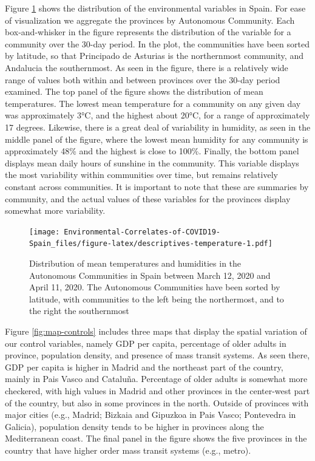 \documentclass[]{elsarticle} %
\begin{document}
Figure \ref{fig:descriptives-temperature} shows the distribution of the
environmental variables in Spain. For ease of visualization we aggregate
the provinces by Autonomous Community. Each box-and-whisker in the
figure represents the distribution of the variable for a community over
the 30-day period. In the plot, the communities have been sorted by
latitude, so that Principado de Asturias is the northernmost community,
and Andalucia the southernmost. As seen in the figure, there is a
relatively wide range of values both within and between provinces over
the 30-day period examined. The top panel of the figure shows the
distribution of mean temperatures. The lowest mean temperature for a
community on any given day was approximately 3°C, and the highest about
20°C, for a range of approximately 17 degrees. Likewise, there is a
great deal of variability in humidity, as seen in the middle panel of
the figure, where the lowest mean humidity for any community is
approximately 48\% and the highest is close to 100\%. Finally, the
bottom panel displays mean daily hours of sunshine in the community.
This variable displays the most variability within communities over
time, but remains relatively constant across communities. It is
important to note that these are summaries by community, and the actual
values of these variables for the provinces display somewhat more
variability.

\begin{figure}
\centering
\texttt{[image: Environmental-Correlates-of-COVID19-Spain\_files/figure-latex/descriptives-temperature-1.pdf]}
\caption{\label{fig:descriptives-temperature} Distribution of mean
temperatures and humidities in the Autonomous Communities in Spain
between March 12, 2020 and April 11, 2020. The Autonomous Communities
have been sorted by latitude, with communities to the left being the
northermost, and to the right the southernmost}
\end{figure}

Figure \ref{fig:map-controls} includes three maps that display the
spatial variation of our control variables, namely GDP per capita,
percentage of older adults in province, population density, and presence
of mass transit systems. As seen there, GDP per capita is higher in
Madrid and the northeast part of the country, mainly in Pais Vasco and
Cataluña. Percentage of older adults is somewhat more checkered, with
high values in Madrid and other provinces in the center-west part of the
country, but also in some provinces in the north. Outside of provinces
with major cities (e.g., Madrid; Bizkaia and Gipuzkoa in Pais Vasco;
Pontevedra in Galicia), population density tends to be higher in
provinces along the Mediterranean coast. The final panel in the figure
shows the five provinces in the country that have higher order mass
transit systems (e.g., metro).
\end{document}
